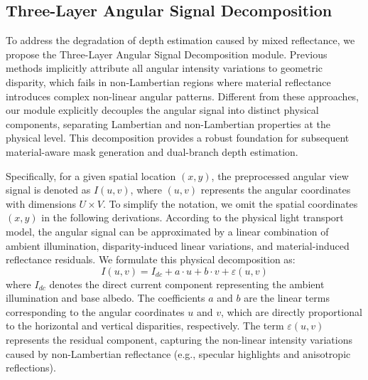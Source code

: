 \documentclass[lettersize,journal]{IEEEtran}
\begin{document}
\subsection{Three-Layer Angular Signal Decomposition}

To address the degradation of depth estimation caused by mixed reflectance, we propose the Three-Layer Angular Signal Decomposition module. Previous methods implicitly attribute all angular intensity variations to geometric disparity, which fails in non-Lambertian regions where material reflectance introduces complex non-linear angular patterns. Different from these approaches, our module explicitly decouples the angular signal into distinct physical components, separating Lambertian and non-Lambertian properties at the physical level. This decomposition provides a robust foundation for subsequent material-aware mask generation and dual-branch depth estimation.

Specifically, for a given spatial location $(x,y)$, the preprocessed angular view signal is denoted as $I(u,v)$, where $(u,v)$ represents the angular coordinates with dimensions $U \times V$. To simplify the notation, we omit the spatial coordinates $(x,y)$ in the following derivations. According to the physical light transport model, the angular signal can be approximated by a linear combination of ambient illumination, disparity-induced linear variations, and material-induced reflectance residuals. We formulate this physical decomposition as:
\begin{equation} \label{eq:ch3_1}
I(u,v) = I_{dc} + a \cdot u + b \cdot v + \varepsilon(u,v)
\end{equation}
where $I_{dc}$ denotes the direct current component representing the ambient illumination and base albedo. The coefficients $a$ and $b$ are the linear terms corresponding to the angular coordinates $u$ and $v$, which are directly proportional to the horizontal and vertical disparities, respectively. The term $\varepsilon(u,v)$ represents the residual component, capturing the non-linear intensity variations caused by non-Lambertian reflectance (e.g., specular highlights and anisotropic reflections).
\end{document}
